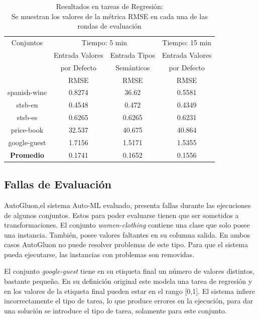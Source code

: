 \begin{table}[H]
  \centering
  \resizebox{15cm}{!} {
  \begin{tabular}{|c|ccc|}
  \hline
  Conjuntos & \multicolumn{2}{P{8cm}|}{Tiempo: 5 min}  & \multicolumn{1}{P{4cm}|}{Tiempo: 15 min} \\ 
  \cline{2-4}
  & \multicolumn{1}{P{4cm}|}{Entrada Valores} & \multicolumn{1}{P{4cm}|}{Entrada Tipos} & \multicolumn{1}{P{4cm}|}{Entrada Valores}\\ 
  & \multicolumn{1}{P{4cm}|}{ por Defecto} & \multicolumn{1}{P{4cm}|}{Semánticos} & \multicolumn{1}{P{4cm}|}{por Defecto}\\ 
  \cline{2-4}
               & RMSE  & RMSE  & RMSE  \\ \hline
  spanish-wine & 0.8274  & 36.62  & 0.5581 \\
  stsb-en      & 0.4548  & 0.472  & 0.4349 \\
  stsb-es      & 0.6265  & 0.6265 & 0.6231   \\ 
  price-book   & 32.537  & 40.675 & 40.864  \\
  google-guest & 1.7156  & 1.5171 & 1.5355  \\ \hline
  \textbf{Promedio} & 0.1741 & 0.1652 & 0.1556 \\ \hline

\end{tabular}
  \caption{Resultados en tareas de Regresión:
  \\Se muestran los valores de la métrica RMSE en cada una de las rondas de evaluación}
  \label{fig:regression}
  }
\end{table}


\subsection{Fallas de Evaluación}\label{subsection:errors}
AutoGluon,el sistema Auto-ML evaluado, presenta fallas durante las ejecuciones de algunos conjuntos. Estos para poder evaluarse tienen que ser sometidos a 
transformaciones.
El conjunto \textit{women-clothing} contiene una clase que solo posee una instancia. También, posee valores faltantes en su columna salida. En ambos casos AutoGluon no 
puede resolver problemas de este tipo. Para que el sistema pueda ejecutarse, las instancias con problemas son removidas.

El conjunto \textit{google-guest} tiene en su etiqueta final un número de valores distintos, bastante pequeño. En su definición original este modela una tarea de regresión y en 
los valores de la etiqueta final pueden estar en el rango [0,1]. El sistema infiere incorrectamente el tipo de tarea, lo que produce errores en la ejecución, para 
dar una solución se introduce el tipo de tarea, solamente para este conjunto.


